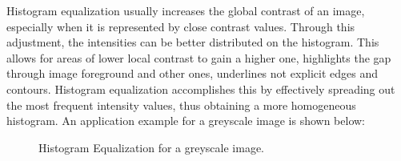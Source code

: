 \documentclass[10pt,twocolumn,letterpaper]{article}
\begin{document}
Histogram equalization usually increases the global contrast of an image, especially when it is represented by close contrast values. Through this adjustment, the intensities can be better distributed on the histogram. This allows for areas of lower local contrast to gain a higher one, highlights the gap through image foreground and other ones, underlines not explicit edges and contours. Histogram equalization accomplishes this by effectively spreading out the most frequent intensity values, thus obtaining a more homogeneous histogram. An application example for a greyscale image is shown below:

\begin{figure}[h]
	\centering
	\qquad
	\qquad

	\qquad
	\caption{Histogram Equalization for a greyscale image.}
	\label{fig:grey_eq}
	
\end{figure}
\end{document}
